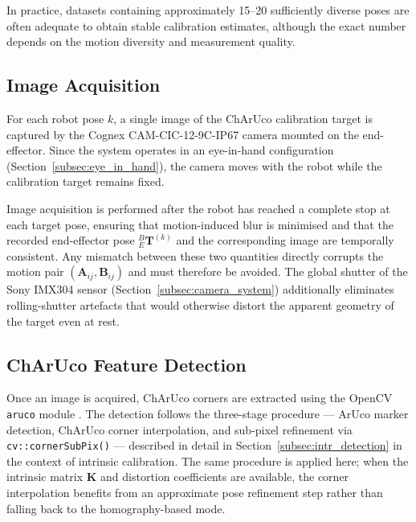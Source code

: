 \noindent In practice, datasets containing approximately 15–20 sufficiently diverse poses are often adequate to obtain stable calibration estimates, although the exact number depends on the motion diversity and measurement quality.

\subsection{Image Acquisition}
\label{subsec:image_acq}

For each robot pose $k$, a single image of the ChArUco calibration target is
captured by the Cognex CAM-CIC-12-9C-IP67 camera mounted on the end-effector.
Since the system operates in an eye-in-hand configuration
(Section~\ref{subsec:eye_in_hand}), the camera moves with the robot while the
calibration target remains fixed.

Image acquisition is performed after the robot has reached a complete stop at
each target pose, ensuring that motion-induced blur is minimised and that the
recorded end-effector pose ${}^B_E\mathbf{T}^{(k)}$ and the corresponding
image are temporally consistent. Any mismatch between these two quantities
directly corrupts the motion pair $(\mathbf{A}_{ij}, \mathbf{B}_{ij})$ and
must therefore be avoided. The global shutter of the Sony IMX304 sensor
(Section~\ref{subsec:camera_system}) additionally eliminates rolling-shutter
artefacts that would otherwise distort the apparent geometry of the target
even at rest.

\subsection{ChArUco Feature Detection}
\label{subsec:feature_detection}

Once an image is acquired, ChArUco corners are extracted using the OpenCV
\texttt{aruco} module \cite{garrido2014aruco, bradski2008learning}. The
detection follows the three-stage procedure — ArUco marker detection,
ChArUco corner interpolation, and sub-pixel refinement via
\texttt{cv::cornerSubPix()} — described in detail in
Section~\ref{subsec:intr_detection} in the context of intrinsic calibration.
The same procedure is applied here; when the intrinsic matrix $\mathbf{K}$
and distortion coefficients are available, the corner interpolation benefits
from an approximate pose refinement step rather than falling back to the
homography-based mode.

